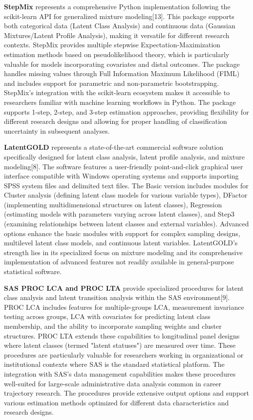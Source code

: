 \documentclass[main.tex]{subfiles}
\begin{document}

\textbf{StepMix} represents a comprehensive Python implementation following the scikit-learn API for generalized mixture modeling[13]. This package supports both categorical data (Latent Class Analysis) and continuous data (Gaussian Mixtures/Latent Profile Analysis), making it versatile for different research contexts. StepMix provides multiple stepwise Expectation-Maximization estimation methods based on pseudolikelihood theory, which is particularly valuable for models incorporating covariates and distal outcomes. The package handles missing values through Full Information Maximum Likelihood (FIML) and includes support for parametric and non-parametric bootstrapping. StepMix's integration with the scikit-learn ecosystem makes it accessible to researchers familiar with machine learning workflows in Python. The package supports 1-step, 2-step, and 3-step estimation approaches, providing flexibility for different research designs and allowing for proper handling of classification uncertainty in subsequent analyses.


\textbf{LatentGOLD} represents a state-of-the-art commercial software solution specifically designed for latent class analysis, latent profile analysis, and mixture modeling[8]. The software features a user-friendly point-and-click graphical user interface compatible with Windows operating systems and supports importing SPSS system files and delimited text files. The Basic version includes modules for Cluster analysis (defining latent class models for various variable types), DFactor (implementing multidimensional structures on latent classes), Regression (estimating models with parameters varying across latent classes), and Step3 (examining relationships between latent classes and external variables). Advanced options enhance the basic modules with support for complex sampling designs, multilevel latent class models, and continuous latent variables. LatentGOLD's strength lies in its specialized focus on mixture modeling and its comprehensive implementation of advanced features not readily available in general-purpose statistical software.

\textbf{SAS PROC LCA and PROC LTA} provide specialized procedures for latent class analysis and latent transition analysis within the SAS environment[9]. PROC LCA includes features for multiple-groups LCA, measurement invariance testing across groups, LCA with covariates for predicting latent class membership, and the ability to incorporate sampling weights and cluster structures. PROC LTA extends these capabilities to longitudinal panel designs where latent classes (termed "latent statuses") are measured over time. These procedures are particularly valuable for researchers working in organizational or institutional contexts where SAS is the standard statistical platform. The integration with SAS's data management capabilities makes these procedures well-suited for large-scale administrative data analysis common in career trajectory research. The procedures provide extensive output options and support various estimation methods optimized for different data characteristics and research designs.
\end{document}
